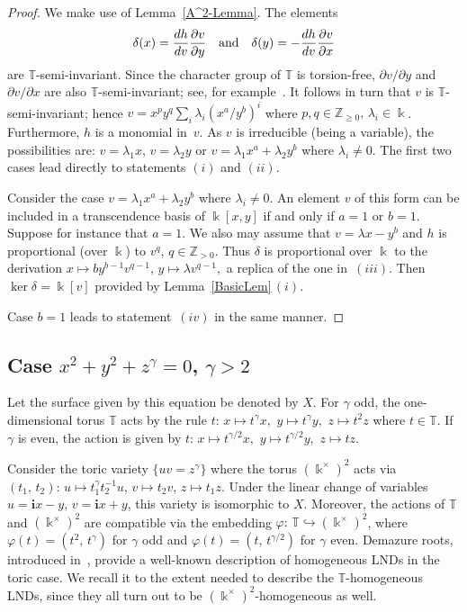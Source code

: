 \documentclass[a4paper,reqno,12pt]{amsart}
\theoremstyle{plain}
\theoremstyle{definition}
\theoremstyle{plain}
\theoremstyle{remark}
\newcommand{\TT}{\mathbb{T}}
\newcommand{\ZZ}{\mathbb Z}
\newcommand{\lmt}{\longmapsto}
\newcommand{\kk}{\Bbbk}
\newcommand{\ii}{\mathbf{i}}
\begin{document}
\begin{proof} 
    We make use of Lemma~\ref{A^2-Lemma}. The elements $$\delta(x)={ {dh}\over{dv}}{\partial v\over\partial y} \quad \mbox{and} \quad \delta(y)=-{dh\over {dv}}{\partial v\over\partial x}$$ are ${\TT}$-semi-invariant. Since the character group of ${\TT}$ is torsion-free, ${\partial v/\partial y}$ and ${\partial v/\partial x}$ are also ${\TT}$-semi-invariant; see, for example~\cite[Lemma 2.3\,(iii)]{A}. It follows in turn that $v$ is ${\TT}$-semi-invariant; hence $v=x^py^q\sum\limits_i \lambda_i\left(x^a/ y^b\right)^i$ where $p,q\in\ZZ_{\ge0},\,\lambda_i\in\Bbbk$. Furthermore, $h$ is a monomial in~$v$. As $v$ is irreducible (being a variable), the possibilities are:
    $v=\lambda_1 x$, $v=\lambda_2 y$ or $v=\lambda_1 x^a+\lambda_2 y^b$ where $\lambda_i\neq0$. 
    The first two cases lead directly to statements $(i)$ and $(ii)$. 
    
    Consider the case $v=\lambda_1 x^a+\lambda_2 y^b$ where $\lambda_i\neq0$. An element $v$ of this form can be included in a transcendence basis of $\Bbbk[x,y]$ if and only if $a=1$ or $b=1$. Suppose for instance that $a=1$. We also may assume that $v= \lambda x- y^b$ and $h$ is proportional (over $\Bbbk$) to $v^q$, $q\in \ZZ_{>0}$. %
    Thus $\delta$ is proportional over $\Bbbk$ to the derivation
    $
    x\longmapsto b y^{b-1} v^{q-1}$, $y\longmapsto  \lambda v^{q-1},
    $ 
    a replica of the one in~$(iii)$. Then $\ker\delta=\kk[v]$ provided by Lemma~\ref{BasicLem}\,$(i)$.
    
    Case $b=1$ leads to statement~$(iv)$ in the same manner.
\end{proof}

\subsection{Case $x^2+y^2+z^\gamma=0$, $\gamma>2$}\label{CaseKotenkova}
Let the surface given by this equation be denoted by $X$. For $\gamma$ odd, the one-dimensional torus ${\TT}$ acts by the rule $t\colon\,x\longmapsto t^\gamma x,$ $y\longmapsto t^\gamma y,$ $z\longmapsto t^2z$ where $t\in {\TT}$. If $\gamma$ is even, the action is given by $t\colon\,x\longmapsto t^{\gamma/2} x,$ $y\longmapsto t^{\gamma/2} y,$ $z\longmapsto tz$.

Consider the toric variety $\{uv=z^\gamma\}$ where the torus $(\Bbbk^\times)^2$ acts via $(t_1,\,t_2)\colon\,u \lmt t_1^\gamma t_2^{-1}u$, $v\lmt t_2 v$, $z\lmt t_1 z$.  Under the linear change of variables $u=\ii x- y,\,v=\ii x+ y$, this variety is isomorphic to $X$. Moreover, the actions of ${\TT}$ and $(\kk^\times)^2$ are compatible via the embedding $\varphi\colon\,{\TT}\hookrightarrow(\Bbbk^\times)^2$, where $\varphi(t)=(t^2,\,t^\gamma)$ for $\gamma$ odd and $\varphi(t)=(t,\,t^{\gamma/ 2})$ for $\gamma$ even. Demazure roots, introduced in~\cite{D}, provide a well-known description of homogeneous LNDs in the toric case. We recall it to the extent needed to describe the ${\TT}$-homogeneous LNDs, since they all turn out to be $(\kk^\times)^2$-homogeneous as well.
\end{document}
